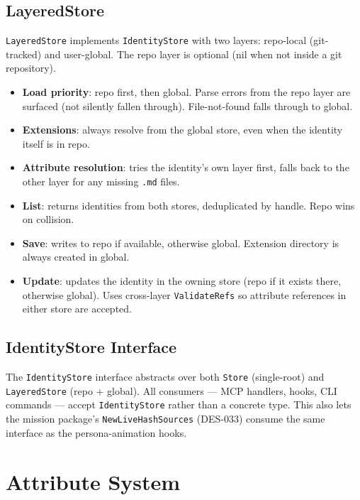 \documentclass[a4paper,10pt]{article}
\begin{document}
\subsection{LayeredStore}

\texttt{LayeredStore} implements \texttt{IdentityStore} with two
layers: repo-local (git-tracked) and user-global.  The repo layer
is optional (nil when not inside a git repository).

\begin{itemize}
  \item \textbf{Load priority}: repo first, then global.  Parse
    errors from the repo layer are surfaced (not silently fallen
    through).  File-not-found falls through to global.
  \item \textbf{Extensions}: always resolve from the global store,
    even when the identity itself is in repo.
  \item \textbf{Attribute resolution}: tries the identity's own
    layer first, falls back to the other layer for any missing
    \texttt{.md} files.
  \item \textbf{List}: returns identities from both stores,
    deduplicated by handle.  Repo wins on collision.
  \item \textbf{Save}: writes to repo if available, otherwise
    global.  Extension directory is always created in global.
  \item \textbf{Update}: updates the identity in the owning store
    (repo if it exists there, otherwise global).  Uses cross-layer
    \texttt{ValidateRefs} so attribute references in either store
    are accepted.
\end{itemize}

\subsection{IdentityStore Interface}

The \texttt{IdentityStore} interface abstracts over both
\texttt{Store} (single-root) and \texttt{LayeredStore} (repo +
global).  All consumers --- MCP handlers, hooks, CLI commands ---
accept \texttt{IdentityStore} rather than a concrete type.  This
also lets the mission package's \texttt{NewLiveHashSources}
(DES-033) consume the same interface as the persona-animation hooks.

\section{Attribute System}
\end{document}
